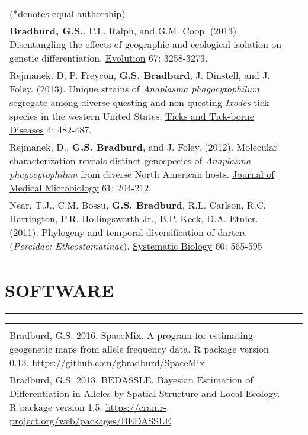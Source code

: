 \documentclass{article}
\begin{document}
\begin{tabular}{>{\everypar{\hangindent1cm}}p{}p{}}
\hspace{4.5mm} (*denotes equal authorship)&\\
%
\vspace{-0.1cm}
%
\textbf{Bradburd, G.S.}, P.L. Ralph, and G.M. Coop. (2013). Disentangling the effects of geographic and ecological isolation on genetic differentiation. \underline{Evolution} 67: 3258-3273. & \hfill \\
%
\vspace{-0.1cm}
%
Rejmanek, D, P. Freycon, \textbf{G.S. Bradburd}, J. Dinstell, and J. Foley.  (2013). Unique strains of \textit{Anaplasma phagocytophilum} segregate among diverse questing and non-questing \textit{Ixodes} tick species in the western United States.  \underline{Ticks and Tick-borne Diseases} 4: 482-487. & \hfill\\
%
\vspace{-0.1cm}
%
Rejmanek, D., \textbf{G.S. Bradburd}, and J. Foley.  (2012). Molecular characterization reveals distinct genospecies of \textit{Anaplasma phagocytophilum} from diverse North American hosts.	\underline{Journal of Medical Microbiology} 61: 204-212. & \hfill \\
%
\vspace{-0.1cm}
%
Near, T.J., C.M. Bossu, \textbf{G.S. Bradburd}, R.L. Carlson, R.C. Harrington, P.R. Hollingsworth Jr., B.P. Keck, D.A. Etnier.  (2011). Phylogeny and temporal diversification of darters (\textit{Percidae: Etheostomatinae}).  \underline{Systematic Biology} 60: 565-595& \hfill\\
%
\end{tabular}
%
\section*{SOFTWARE}
\vspace{-0.6cm}
\rule{470pt}{0.4pt}
\begin{tabular}{>{\everypar{\hangindent1cm}}p{}p{}}
\hfill\\
%
Bradburd, G.S. 2016. SpaceMix. A program for estimating geogenetic maps from allele frequency data. R package version 0.13.
\href{https://github.com/gbradburd/SpaceMix}{https://github.com/gbradburd/SpaceMix}\\
%
\vspace{-0.1cm}
%
Bradburd, G.S. 2013. BEDASSLE. Bayesian Estimation of Differentiation in Alleles by Spatial Structure and Local Ecology. 
R package version 1.5. \href{https://cran.r-project.org/web/packages/BEDASSLE}{https://cran.r-project.org/web/packages/BEDASSLE}\\
%
\end{tabular}
%
\end{document}
